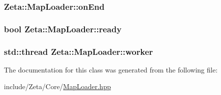 \hypertarget{classZeta_1_1MapLoader_a5f9ca0c93a698b67b7cb9dfff3828cc1}{
\subsubsection[{on\+End}]{ Zeta\+::\+Map\+Loader\+::on\+End\hspace{0.3cm}{\ttfamily [private]}}}\label{classZeta_1_1MapLoader_a5f9ca0c93a698b67b7cb9dfff3828cc1}
\hypertarget{classZeta_1_1MapLoader_a44233c4f572f8b99aeceb47f7c2300db}{
\subsubsection[{ready}]{\setlength{\rightskip}{0pt plus 5cm}bool Zeta\+::\+Map\+Loader\+::ready\hspace{0.3cm}{\ttfamily [private]}}}\label{classZeta_1_1MapLoader_a44233c4f572f8b99aeceb47f7c2300db}
\hypertarget{classZeta_1_1MapLoader_a73bd9a2d52358d4c8188327505919fa6}{
\subsubsection[{worker}]{\setlength{\rightskip}{0pt plus 5cm}std\+::thread Zeta\+::\+Map\+Loader\+::worker\hspace{0.3cm}{\ttfamily [private]}}}\label{classZeta_1_1MapLoader_a73bd9a2d52358d4c8188327505919fa6}


The documentation for this class was generated from the following file\+:\begin{DoxyCompactItemize}
\item 
include/\+Zeta/\+Core/\hyperlink{MapLoader_8hpp}{Map\+Loader.\+hpp}\end{DoxyCompactItemize}
